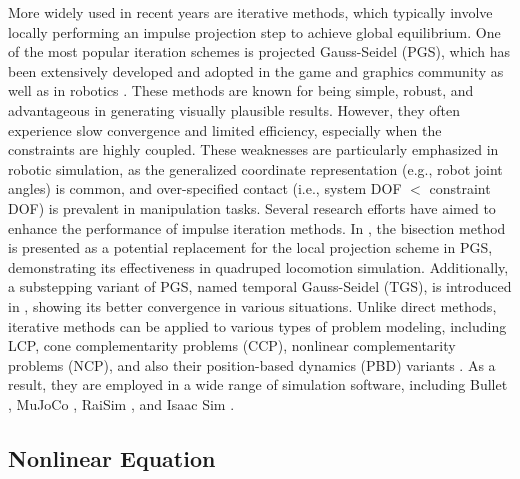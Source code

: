 More widely used in recent years are iterative methods, which typically involve locally performing an impulse projection step to achieve global equilibrium. 
One of the most popular iteration schemes is projected Gauss-Seidel (PGS), which has been extensively developed and adopted in the game and graphics community \cite{macklin2014unified,macklin2016xpbd} as well as in robotics \cite{todorov2014convex,horak2019similarities}. 
These methods are known for being simple, robust, and advantageous in generating visually plausible results. 
However, they often experience slow convergence and limited efficiency, especially when the constraints are highly coupled. 
These weaknesses are particularly emphasized in robotic simulation, as the generalized coordinate representation (e.g., robot joint angles) is common, and over-specified contact (i.e., system DOF $<$ constraint DOF) is prevalent in manipulation tasks.
Several research efforts have aimed to enhance the performance of impulse iteration methods. In \cite{hwangbo2018per}, the bisection method is presented as a potential replacement for the local projection scheme in PGS, demonstrating its effectiveness in quadruped locomotion simulation. Additionally, a substepping variant of PGS, named temporal Gauss-Seidel (TGS), is introduced in \cite{macklin2019small}, showing its better convergence in various situations.
Unlike direct methods, iterative methods can be applied to various types of problem modeling, including LCP, cone complementarity problems (CCP), nonlinear complementarity problems (NCP), and also their position-based dynamics (PBD) variants \cite{muller2020detailed}. 
As a result, they are employed in a wide range of simulation software, including Bullet \cite{bullet}, MuJoCo \cite{mujoco}, RaiSim \cite{RaiSim}, and Isaac Sim \cite{makoviychuk2021isaac}.

\subsection{Nonlinear Equation}

